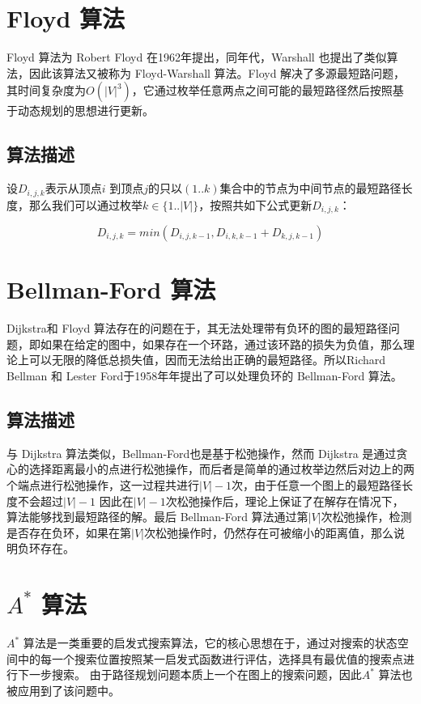 \documentclass{standalone}
\begin{document}
\section{Floyd 算法}
Floyd 算法为 Robert Floyd 在1962年提出，同年代，Warshall 也提出了类似算法，因此该算法又被称为 Floyd-Warshall 算法。Floyd 解决了多源最短路问题，其时间复杂度为$O(|V|^3)$，它通过枚举任意两点之间可能的最短路径然后按照基于动态规划的思想进行更新。
\subsection{算法描述}
设$D_{i,j,k}$表示从顶点$i$ 到顶点$j$的只以$(1..k)$集合中的节点为中间节点的最短路径长度，那么我们可以通过枚举$k \in \{1..|V|\}$，按照共如下公式更新$D_{i,j,k}$：
\begin{center}
    \begin{equation}
    D_{i,j,k} = min(D_{i,j,k-1}, D_{i,k,k-1} + D_{k,j,k-1})
\end{equation}
\end{center}
\section{Bellman-Ford 算法}
Dijkstra和 Floyd 算法存在的问题在于，其无法处理带有负环的图的最短路径问题，即如果在给定的图中，如果存在一个环路，通过该环路的损失为负值，那么理论上可以无限的降低总损失值，因而无法给出正确的最短路径。所以Richard Bellman 和 Lester Ford于1958年年提出了可以处理负环的 Bellman-Ford 算法。
\subsection{算法描述}
与 Dijkstra 算法类似，Bellman-Ford也是基于松弛操作，然而 Dijkstra 是通过贪心的选择距离最小的点进行松弛操作，而后者是简单的通过枚举边然后对边上的两个端点进行松弛操作，这一过程共进行$|V|-1$次，由于任意一个图上的最短路径长度不会超过$|V|-1$
因此在$|V|-1$次松弛操作后，理论上保证了在解存在情况下，算法能够找到最短路径的解。最后 Bellman-Ford 算法通过第$|V|$次松弛操作，检测是否存在负环，如果在第$|V|$次松弛操作时，仍然存在可被缩小的距离值，那么说明负环存在。
\section{$A^{*}$ 算法}
$A^{*}$ 算法是一类重要的启发式搜索算法，它的核心思想在于，通过对搜索的状态空间中的每一个搜索位置按照某一启发式函数进行评估，选择具有最优值的搜索点进行下一步搜索。
由于路径规划问题本质上一个在图上的搜索问题，因此$A^{*}$ 算法也被应用到了该问题中。
\end{document}

